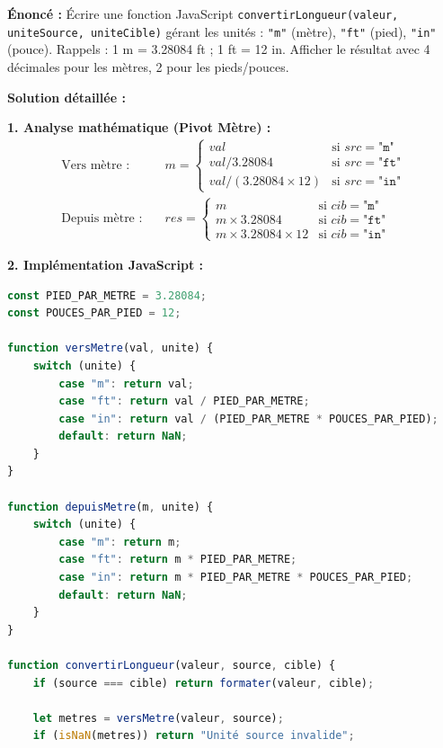 \documentclass[11pt]{article}
\begin{document}
\begin{exoresolu}
\textbf{Énoncé :} Écrire une fonction JavaScript \texttt{convertirLongueur(valeur, uniteSource, uniteCible)} gérant les unités : \texttt{"m"} (mètre), \texttt{"ft"} (pied), \texttt{"in"} (pouce). 
Rappels : 1 m = 3.28084 ft ; 1 ft = 12 in.
Afficher le résultat avec 4 décimales pour les mètres, 2 pour les pieds/pouces.

\tcblower
\textbf{Solution détaillée :}

\textbf{1. Analyse mathématique (Pivot Mètre) :}
\begin{align*}
    \text{Vers mètre :} \quad & m = \begin{cases} 
    val & \text{si } src=\texttt{"m"} \\
    val / 3.28084 & \text{si } src=\texttt{"ft"} \\
    val / (3.28084 \times 12) & \text{si } src=\texttt{"in"}
    \end{cases} \\
    \text{Depuis mètre :} \quad & res = \begin{cases} 
    m & \text{si } cib=\texttt{"m"} \\
    m \times 3.28084 & \text{si } cib=\texttt{"ft"} \\
    m \times 3.28084 \times 12 & \text{si } cib=\texttt{"in"}
    \end{cases}
\end{align*}

\textbf{2. Implémentation JavaScript :}
\begin{lstlisting}[language=JavaScript]
const PIED_PAR_METRE = 3.28084;
const POUCES_PAR_PIED = 12;

function versMetre(val, unite) {
    switch (unite) {
        case "m": return val;
        case "ft": return val / PIED_PAR_METRE;
        case "in": return val / (PIED_PAR_METRE * POUCES_PAR_PIED);
        default: return NaN;
    }
}

function depuisMetre(m, unite) {
    switch (unite) {
        case "m": return m;
        case "ft": return m * PIED_PAR_METRE;
        case "in": return m * PIED_PAR_METRE * POUCES_PAR_PIED;
        default: return NaN;
    }
}

function convertirLongueur(valeur, source, cible) {
    if (source === cible) return formater(valeur, cible);
    
    let metres = versMetre(valeur, source);
    if (isNaN(metres)) return "Unité source invalide";
    

\end{lstlisting}
\end{exoresolu}
\end{document}
